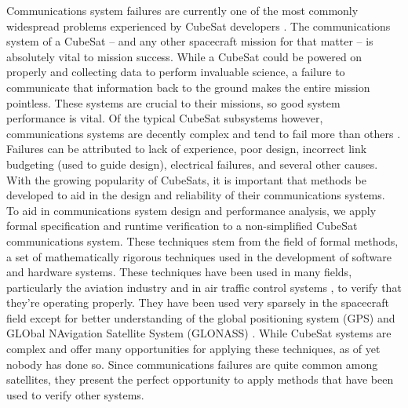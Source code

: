 \documentclass[conf]{new-aiaa}
\begin{document}
Communications system failures are currently one of the most commonly widespread problems experienced by CubeSat developers \cite{Improving2017,Langer2016}. The communications system of a CubeSat -- and any other spacecraft mission for that matter -- is absolutely vital to mission success. While a CubeSat could be powered on properly and collecting data to perform invaluable science, a failure to communicate that information back to the ground makes the entire mission pointless. These systems are crucial to their missions, so good system performance is vital. Of the typical CubeSat subsystems however, communications systems are decently complex and tend to fail more than others \cite{Improving2017,cubesat101}. Failures can be attributed to lack of experience, poor design, incorrect link budgeting (used to guide design), electrical failures, and several other causes. With the growing popularity of CubeSats, it is important that methods be developed to aid in the design and reliability of their communications systems.\\

To aid in communications system design and performance analysis, we apply formal specification and runtime verification to a non-simplified CubeSat communications system. These techniques stem from the field of formal methods, a set of mathematically rigorous techniques used in the development of software and hardware systems. These techniques have been used in many fields, particularly the aviation industry and in air traffic control systems \cite{GCMTR16,DRR17}, to verify that they're operating properly. They have been used very sparsely in the spacecraft field except for better understanding of the global positioning system (GPS) and GLObal NAvigation Satellite System (GLONASS) \cite{peng2013}. While CubeSat systems are complex and offer many opportunities for applying these techniques, as of yet nobody has done so. Since communications failures are quite common among satellites, they present the perfect opportunity to apply methods that have been used to verify other systems.\\
\end{document}
